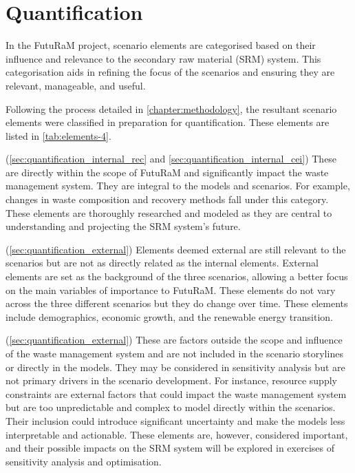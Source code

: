 \chapter{Quantification}\label{chapter:quantification}
\localtableofcontents
{}

\clearpage


In the FutuRaM project, scenario elements are categorised based on their influence and relevance to the secondary raw material (SRM) system. This categorisation aids in refining the focus of the scenarios and ensuring they are relevant, manageable, and useful.

Following the process detailed in \autoref{chapter:methodology}, the resultant scenario elements were classified in preparation for quantification. These elements are listed in \autoref{tab:elements-4}.

\begin{description}[style=nextline]
    \item[Internal Elements:](\autoref{sec:quantification_internal_rec} and \autoref{sec:quantification_internal_cei})
    These are directly within the scope of FutuRaM and significantly impact the waste management system. They are integral to the models and scenarios. For example, changes in waste composition and recovery methods fall under this category. These elements are thoroughly researched and modeled as they are central to understanding and projecting the SRM system's future.
    \item[External Elements:](\autoref{sec:quantification_external})
    Elements deemed external are still relevant to the scenarios but are not as directly related as the internal elements. External elements are set as the background of the three scenarios, allowing a better focus on the main variables of importance to FutuRaM. These elements do not vary across the three different scenarios but they do change over time. These elements include demographics, economic growth, and the renewable energy transition.
    \item[Outside Elements:](\autoref{sec:quantification_external})
    These are factors outside the scope and influence of the waste management system and are not included in the scenario storylines or directly in the models. They may be considered in sensitivity analysis but are not primary drivers in the scenario development. For instance, resource supply constraints are external factors that could impact the waste management system but are too unpredictable and complex to model directly within the scenarios. Their inclusion could introduce significant uncertainty and make the models less interpretable and actionable. These elements are, however, considered important, and their possible impacts on the SRM system will be explored in exercises of sensitivity analysis and optimisation. 
  \end{description}

